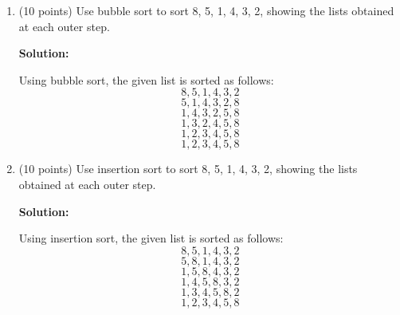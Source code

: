 \documentclass[11pt]{article}
\begin{document}
\begin{enumerate}
\item (10 points)
Use bubble sort to sort 8, 5, 1, 4, 3, 2, showing the lists obtained 
at each outer step.

\textbf{Solution: }

Using bubble sort, the given list is sorted as follows:
$$ 8, 5, 1, 4, 3, 2 $$
$$ 5, 1, 4, 3, 2, 8 $$
$$ 1, 4, 3, 2, 5, 8 $$
$$ 1, 3, 2, 4, 5, 8 $$
$$ 1, 2, 3, 4, 5, 8 $$
$$ 1, 2, 3, 4, 5, 8 $$

\item (10 points)
Use insertion sort to sort 8, 5, 1, 4, 3, 2, showing the lists obtained 
at each outer step.

\textbf{Solution: }

Using insertion sort, the given list is sorted as follows:
$$ 8, 5, 1, 4, 3, 2 $$
$$ 5, 8, 1, 4, 3, 2 $$
$$ 1, 5, 8, 4, 3, 2 $$
$$ 1, 4, 5, 8, 3, 2 $$
$$ 1, 3, 4, 5, 8, 2 $$
$$ 1, 2, 3, 4, 5, 8 $$

\end{enumerate}
\end{document}
